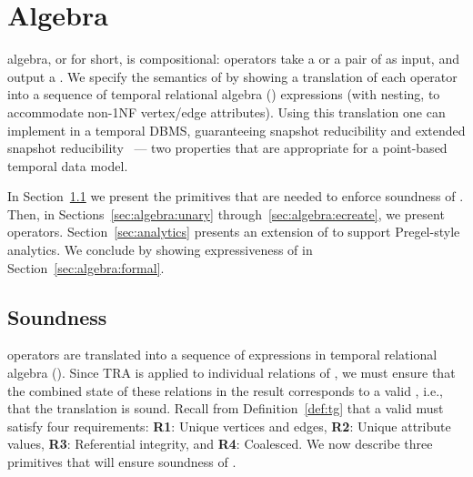 \section{Algebra}
\label{sec:algebra}
\setlength{\textfloatsep}{5pt}%

\tg algebra, or \tga for short, is compositional: operators take a \tg
or a pair of \tgs as input, and output a \tg.  We specify the
semantics of \tga by showing a translation of each operator into a
sequence of temporal relational algebra (\tra) expressions (with
nesting, to accommodate non-1NF vertex/edge attributes).  Using this
translation one can implement \tga in a temporal DBMS, guaranteeing
snapshot reducibility and extended snapshot
reducibility~\cite{DBLP:reference/db/Bohlen092} --- two properties
that are appropriate for a point-based temporal data model.



In Section~\ref{sec:algebra:integrity} we present the primitives that
are needed to enforce soundness of \tga.  Then, in
Sections~\ref{sec:algebra:unary} through~\ref{sec:algebra:ecreate}, we
present \tga operators.  Section~\ref{sec:analytics} presents an
extension of \tga to support Pregel-style analytics.  We conclude by
showing expressiveness of \tga in Section~\ref{sec:algebra:formal}.

\subsection{Soundness}
\label{sec:algebra:integrity}

\tga operators are translated into a sequence of expressions in
temporal relational algebra (\tra).  Since TRA is applied to
individual relations of \tve, we must ensure that the combined state
of these relations in the result corresponds to a valid \tg, i.e.,
that the translation is sound.  Recall from Definition~\ref{def:tg}
that a valid \tg must satisfy four requirements: {\bf R1}: Unique
vertices and edges, {\bf R2}: Unique attribute values, {\bf R3}:
Referential integrity, and {\bf R4}: Coalesced.  We now describe three
primitives that will ensure soundness of \tga.

